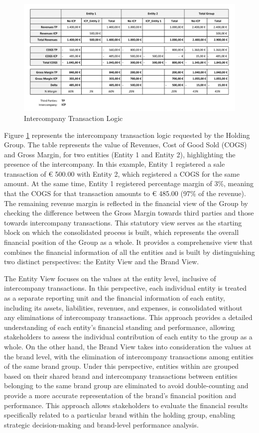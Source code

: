 \documentclass[12pt,a4paper,openright,twoside]{book}
\begin{document}
\begin{figure}[htbp]
	\centering
	\includegraphics[width=\linewidth]{figures/intercompany.pdf}
	\caption{Intercompany Transaction Logic}
	\label{fig:icp}
\end{figure}

Figure \ref{fig:icp} represents the intercompany transaction logic requested by the Holding Group.
%
The table represents the value of Revenues, Cost of Good Sold (COGS) and Gross Margin, for two entities (Entity 1 and Entity 2), highlighting the presence of the intercompany.
%
In this example, Entity 1 registered a sale transaction of € 500.00 with Entity 2, which registered a COGS for the same amount. 
%
At the same time, Entity 1 registered percentage margin of 3\%, meaning that the COGS for that transaction amounts to € 485.00 (97\% of the revenue).
%
The remaining revenue margin is reflected in the financial view of the Group by checking the difference between the Gross Margin towards third parties and those towards intercompany transactions.
%
This statutory view serves as the starting block on which the consolidated process is built, which represents the overall financial position of the Group as a whole.
%
It provides a comprehensive view that combines the financial information of all the entities and is built by distinguishing two distinct perspectives: the Entity View and the Brand View.

The Entity View focuses on the values at the entity level, inclusive of intercompany transactions.
%
In this perspective, each individual entity is treated as a separate reporting unit and the financial information of each entity, including its assets, liabilities, revenues, and expenses, is consolidated without any eliminations of intercompany transactions. 
%
This approach provides a detailed understanding of each entity's financial standing and performance, allowing stakeholders to assess the individual contribution of each entity to the group as a whole.
%
On the other hand, the Brand View takes into consideration the values at the brand level, with the elimination of intercompany transactions among entities of the same brand group. 
%
Under this perspective, entities within are grouped based on their shared brand and intercompany transactions between entities belonging to the same brand group are eliminated to avoid double-counting and provide a more accurate representation of the brand's financial position and performance. 
%
This approach allows stakeholders to evaluate the financial results specifically related to a particular brand within the holding group, enabling strategic decision-making and brand-level performance analysis.
\end{document}
